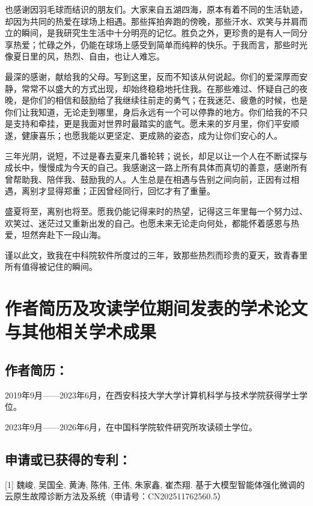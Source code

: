 也感谢因羽毛球而结识的朋友们。大家来自五湖四海，原本有着不同的生活轨迹，却因为共同的热爱在球场上相遇。那些挥拍奔跑的傍晚，那些汗水、欢笑与并肩而立的瞬间，是我研究生生活中十分明亮的记忆。胜负之外，更珍贵的是有人一同分享热爱；忙碌之外，仍能在球场上感受到简单而纯粹的快乐。于我而言，那些时光像夏日里的风，热烈、自由，也让人难忘。

最深的感谢，献给我的父母。写到这里，反而不知该从何说起。你们的爱深厚而安静，常常不以盛大的方式出现，却始终稳稳地托住我。在那些难过、怀疑自己的夜晚，是你们的相信和鼓励给了我继续往前走的勇气；在我迷茫、疲惫的时候，也是你们让我知道，无论走到哪里，身后永远有一个可以停靠的地方。你们给我的不只是支持和牵挂，更是我面对世界时最踏实的底气。愿未来的岁月里，你们平安顺遂，健康喜乐；也愿我能以更坚定、更成熟的姿态，成为让你们安心的人。

三年光阴，说短，不过是春去夏来几番轮转；说长，却足以让一个人在不断试探与成长中，慢慢成为今天的自己。我感谢这一路上所有具体而真切的善意，感谢所有曾帮助我、陪伴我、鼓励我的人。人生总是在相遇与告别之间向前，正因有过相遇，离别才显得郑重；正因曾经同行，回忆才有了重量。

盛夏将至，离别也将至。愿我仍能记得来时的热望，记得这三年里每一个努力过、欢笑过、迷茫过又重新出发的自己。也愿未来无论走向何处，都能怀着感恩与热爱，坦然奔赴下一段山海。

谨以此文，致我在中科院软件所度过的三年，致那些热烈而珍贵的夏天，致青春里所有值得被记住的瞬间。


\chapter{作者简历及攻读学位期间发表的学术论文与其他相关学术成果}

\section*{作者简历：}

2019年9月——2023年6月，在西安科技大学大学计算机科学与技术学院获得学士学位。

2023年9月——2026年6月，在中国科学院软件研究所攻读硕士学位。


\section*{申请或已获得的专利：}
[1] 魏峻, 吴国全, 黄涛, 陈伟, 王伟, 朱家鑫, 崔杰翔. 基于大模型智能体强化微调的云原生故障诊断方法及系统（申请号：CN202511762560.5）


\cleardoublepage[plain]%
